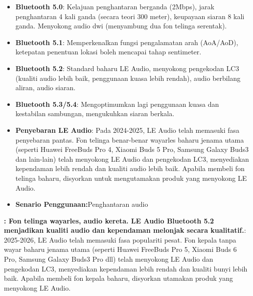 \begin{itemize}
  \item \textbf{Bluetooth 5.0}: Kelajuan penghantaran berganda (2Mbps), jarak penghantaran 4 kali ganda (secara teori 300 meter), keupayaan siaran 8 kali ganda. Menyokong audio dwi (menyambung dua fon telinga serentak).
  \item \textbf{Bluetooth 5.1}: Memperkenalkan fungsi pengalamatan arah (AoA/AoD), ketepatan penentuan lokasi boleh mencapai tahap sentimeter.
  \item \textbf{Bluetooth 5.2}: Standard baharu LE Audio, menyokong pengekodan LC3 (kualiti audio lebih baik, penggunaan kuasa lebih rendah), audio berbilang aliran, audio siaran.
  \item \textbf{Bluetooth 5.3/5.4}: Mengoptimumkan lagi penggunaan kuasa dan kestabilan sambungan, mengukuhkan siaran berkala.
  \item \textbf{Penyebaran LE Audio}: Pada 2024-2025, LE Audio telah memasuki fasa penyebaran pantas. Fon telinga benar-benar wayarles baharu jenama utama (seperti Huawei FreeBuds Pro 4, Xiaomi Buds 5 Pro, Samsung Galaxy Buds3 dan lain-lain) telah menyokong LE Audio dan pengekodan LC3, menyediakan kependaman lebih rendah dan kualiti audio lebih baik. Apabila membeli fon telinga baharu, disyorkan untuk mengutamakan produk yang menyokong LE Audio.
  \item \textbf{Senario Penggunaan:}Penghantaran audio
\end{itemize}

\textbf{: Fon telinga wayarles, audio kereta. LE Audio Bluetooth 5.2 menjadikan kualiti audio dan kependaman melonjak secara kualitatif.}: 2025-2026, LE Audio telah memasuki fasa populariti pesat. Fon kepala tanpa wayar baharu jenama utama (seperti Huawei FreeBuds Pro 5, Xiaomi Buds 6 Pro, Samsung Galaxy Buds3 Pro dll) telah menyokong LE Audio dan pengekodan LC3, menyediakan kependaman lebih rendah dan kualiti bunyi lebih baik. Apabila membeli fon kepala baharu, disyorkan utamakan produk yang menyokong LE Audio.


